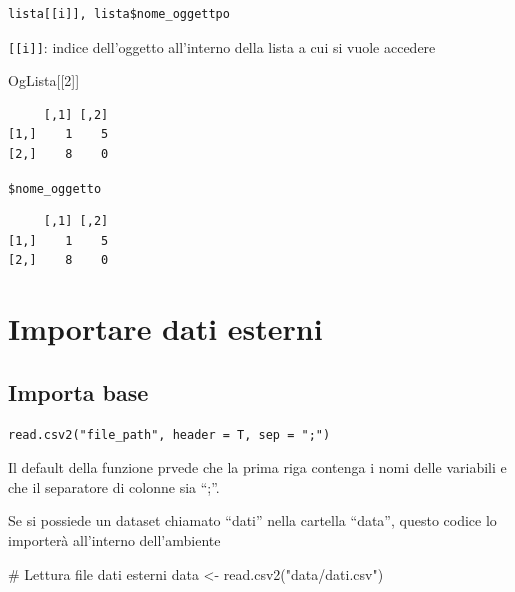 \documentclass[
  ignorenonframetext,
  compress, aspectratio=149]{beamer}
\newenvironment{Shaded}{}{}
\newcommand{\CommentTok}[1]{\textcolor[rgb]{0.54,0.53,0.53}{#1}}
\newcommand{\DecValTok}[1]{\textcolor[rgb]{0.69,0.50,0.00}{#1}}
\newcommand{\FunctionTok}[1]{\textcolor[rgb]{0.39,0.29,0.61}{#1}}
\newcommand{\NormalTok}[1]{\textcolor[rgb]{0.12,0.11,0.11}{#1}}
\newcommand{\OtherTok}[1]{\textcolor[rgb]{0.00,0.43,0.16}{#1}}
\newcommand{\SpecialCharTok}[1]{\textcolor[rgb]{0.24,0.68,0.91}{#1}}
\newcommand{\StringTok}[1]{\textcolor[rgb]{0.75,0.01,0.01}{#1}}
\begin{document}
\begin{frame}[fragile]{}
\label{section-14}
\begin{verbatim}
lista[[i]], lista$nome_oggettpo
\end{verbatim}

\texttt{{[}{[}i{]}{]}}: indice dell'oggetto all'interno della lista a
cui si vuole accedere

\small

\begin{Shaded}
\begin{Highlighting}[]
\NormalTok{OgLista[[}\DecValTok{2}\NormalTok{]]}
\end{Highlighting}
\end{Shaded}

\begin{verbatim}
     [,1] [,2]
[1,]    1    5
[2,]    8    0
\end{verbatim}

\texttt{\$nome\_oggetto}

\begin{Shaded}
\end{Shaded}

\begin{verbatim}
     [,1] [,2]
[1,]    1    5
[2,]    8    0
\end{verbatim}
\end{frame}

\section{Importare dati esterni}\label{importare-dati-esterni}

\subsection{Importa base}\label{importa-base}

\begin{frame}[fragile]{}
\label{section-15}
\begin{verbatim}
read.csv2("file_path", header = T, sep = ";")
\end{verbatim}

Il default della funzione prvede che la prima riga contenga i nomi delle
variabili e che il separatore di colonne sia ``;''.

Se si possiede un dataset chiamato ``dati'' nella cartella ``data'',
questo codice lo importerà all'interno dell'ambiente

\begin{Shaded}
\begin{Highlighting}[]
\CommentTok{\# Lettura file dati esterni}
\NormalTok{data }\OtherTok{\textless{}{-}} \FunctionTok{read.csv2}\NormalTok{(}\StringTok{"data/dati.csv"}\NormalTok{)}
\end{Highlighting}
\end{Shaded}
\end{frame}
\end{document}
